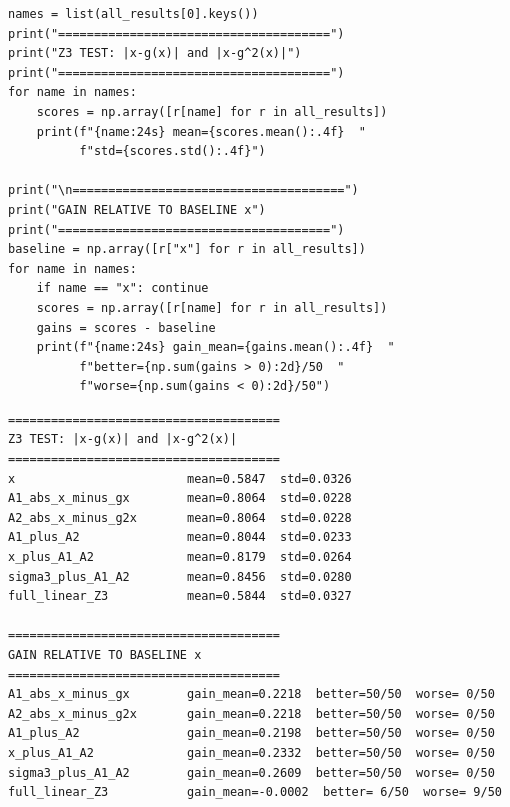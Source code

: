 \documentclass[11pt,a4paper]{report}
\begin{document}
\begin{lstlisting}[caption=SBOHN Experiment 6: full $\mathbb{Z}_3$ group]
names = list(all_results[0].keys())
print("======================================")
print("Z3 TEST: |x-g(x)| and |x-g^2(x)|")
print("======================================")
for name in names:
    scores = np.array([r[name] for r in all_results])
    print(f"{name:24s} mean={scores.mean():.4f}  "
          f"std={scores.std():.4f}")

print("\n======================================")
print("GAIN RELATIVE TO BASELINE x")
print("======================================")
baseline = np.array([r["x"] for r in all_results])
for name in names:
    if name == "x": continue
    scores = np.array([r[name] for r in all_results])
    gains = scores - baseline
    print(f"{name:24s} gain_mean={gains.mean():.4f}  "
          f"better={np.sum(gains > 0):2d}/50  "
          f"worse={np.sum(gains < 0):2d}/50")
\end{lstlisting}

\label{app:ch3-lst12}
\begin{lstlisting}[style=textstyle, caption=Result of SBOHN-6 experiment]
======================================
Z3 TEST: |x-g(x)| and |x-g^2(x)|
======================================
x                        mean=0.5847  std=0.0326
A1_abs_x_minus_gx        mean=0.8064  std=0.0228
A2_abs_x_minus_g2x       mean=0.8064  std=0.0228
A1_plus_A2               mean=0.8044  std=0.0233
x_plus_A1_A2             mean=0.8179  std=0.0264
sigma3_plus_A1_A2        mean=0.8456  std=0.0280
full_linear_Z3           mean=0.5844  std=0.0327

======================================
GAIN RELATIVE TO BASELINE x
======================================
A1_abs_x_minus_gx        gain_mean=0.2218  better=50/50  worse= 0/50
A2_abs_x_minus_g2x       gain_mean=0.2218  better=50/50  worse= 0/50
A1_plus_A2               gain_mean=0.2198  better=50/50  worse= 0/50
x_plus_A1_A2             gain_mean=0.2332  better=50/50  worse= 0/50
sigma3_plus_A1_A2        gain_mean=0.2609  better=50/50  worse= 0/50
full_linear_Z3           gain_mean=-0.0002  better= 6/50  worse= 9/50
\end{lstlisting}
\end{document}
